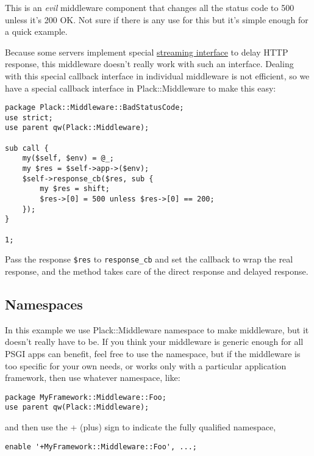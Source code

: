 This is an \emph{evil} middleware component that changes all the status
code to 500 unless it's 200 OK. Not sure if there is any use for this
but it's simple enough for a quick example.

Because some servers implement special
\href{http://bulknews.typepad.com/blog/2009/10/psgiplack-streaming-is-now-complete.html}{streaming
interface} to delay HTTP response, this middleware doesn't really work
with such an interface. Dealing with this special callback interface in
individual middleware is not efficient, so we have a special callback
interface in Plack::Middleware to make this easy:

\begin{lstlisting}
package Plack::Middleware::BadStatusCode;
use strict;
use parent qw(Plack::Middleware);

sub call {
    my($self, $env) = @_;
    my $res = $self->app->($env);
    $self->response_cb($res, sub {
        my $res = shift;
        $res->[0] = 500 unless $res->[0] == 200;
    });
}

1;
\end{lstlisting}

Pass the response \lstinline!$res! to \lstinline!response_cb! and set
the callback to wrap the real response, and the method takes care of the
direct response and delayed response.

\subsection{Namespaces}\label{namespaces}

In this example we use Plack::Middleware namespace to make middleware,
but it doesn't really have to be. If you think your middleware is
generic enough for all PSGI apps can benefit, feel free to use the
namespace, but if the middleware is too specific for your own needs, or
works only with a particular application framework, then use whatever
namespace, like:

\begin{lstlisting}
package MyFramework::Middleware::Foo;
use parent qw(Plack::Middleware);
\end{lstlisting}

and then use the + (plus) sign to indicate the fully qualified
namespace,

\begin{lstlisting}
enable '+MyFramework::Middleware::Foo', ...;
\end{lstlisting}

